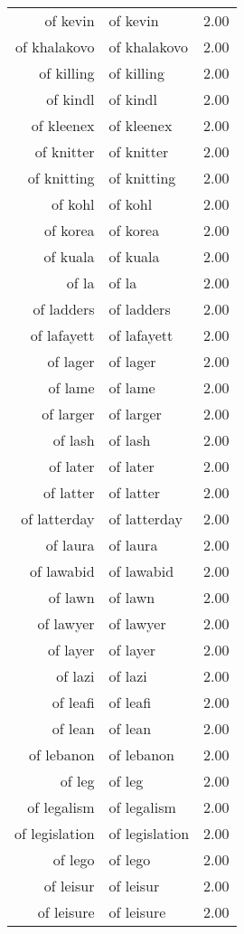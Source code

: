 \begin{table}[ht]
\begin{tabular}{rlr}
  of kevin & of kevin & 2.00 \\ 
  of khalakovo & of khalakovo & 2.00 \\ 
  of killing & of killing & 2.00 \\ 
  of kindl & of kindl & 2.00 \\ 
  of kleenex & of kleenex & 2.00 \\ 
  of knitter & of knitter & 2.00 \\ 
  of knitting & of knitting & 2.00 \\ 
  of kohl & of kohl & 2.00 \\ 
  of korea & of korea & 2.00 \\ 
  of kuala & of kuala & 2.00 \\ 
  of la & of la & 2.00 \\ 
  of ladders & of ladders & 2.00 \\ 
  of lafayett & of lafayett & 2.00 \\ 
  of lager & of lager & 2.00 \\ 
  of lame & of lame & 2.00 \\ 
  of larger & of larger & 2.00 \\ 
  of lash & of lash & 2.00 \\ 
  of later & of later & 2.00 \\ 
  of latter & of latter & 2.00 \\ 
  of latterday & of latterday & 2.00 \\ 
  of laura & of laura & 2.00 \\ 
  of lawabid & of lawabid & 2.00 \\ 
  of lawn & of lawn & 2.00 \\ 
  of lawyer & of lawyer & 2.00 \\ 
  of layer & of layer & 2.00 \\ 
  of lazi & of lazi & 2.00 \\ 
  of leafi & of leafi & 2.00 \\ 
  of lean & of lean & 2.00 \\ 
  of lebanon & of lebanon & 2.00 \\ 
  of leg & of leg & 2.00 \\ 
  of legalism & of legalism & 2.00 \\ 
  of legislation & of legislation & 2.00 \\ 
  of lego & of lego & 2.00 \\ 
  of leisur & of leisur & 2.00 \\ 
  of leisure & of leisure & 2.00 \\ 

\end{tabular}
\end{table}
